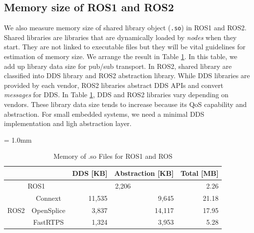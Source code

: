 \documentclass{sig-alternate-05-2015}
\begin{document}
\subsection{Memory size of ROS1 and ROS2}
\label{sec:throughput}
We also measure memory size of shared library object (\texttt{.so}) in ROS1 and ROS2.
Shared libraries are libraries that are dynamically loaded by \emph{nodes} when they start.
They are not linked to executable files but they will be vital guidelines for estimation of memory size.
We arrange the result in Table \ref{tb:memory}.
In this table, we add up library data size for pub/sub transport.
In ROS2, shared library are classified into DDS library and ROS2 abstraction library.
While DDS libraries are provided by each vendor, ROS2 libraries abstract DDS APIs and convert \emph{messages} for DDS.
In Table \ref{tb:memory}, DDS and ROS2 libraries vary depending on vendors.
These library data size tends to increase because its QoS capability and abstraction.
For small embedded systems, we need a minimal DDS implementation and ligh abstraction layer.

\begin{table}[t]
  \caption{Memory of .so Files for ROS1 and ROS} 
  \centering
    \renewcommand{\arraystretch}{1.15}
    \label{tb:memory}
    \small
    \tabcolsep = 1.0mm              %
    \begin{tabular}{c|c||r|r||r}
      \hline
      \multicolumn{2}{c||}{} & DDS [KB] & Abstraction [KB] & Total [MB] \\ \hline \hline
      \multicolumn{2}{c||}{ROS1}  & \multicolumn{2}{c||}{ 2,206 } & 2.26 \\ \hline
      \multirow{3}{*}{ROS2} & Connext & 11,535 & 9,645 & 21.18 \\ 
      & OpenSplice & 3,837 & 14,117 & 17.95 \\ 
      & FastRTPS & 1,324 & 3,953 & 5.28\\ \hline
    \end{tabular}
\end{table}
\end{document}
